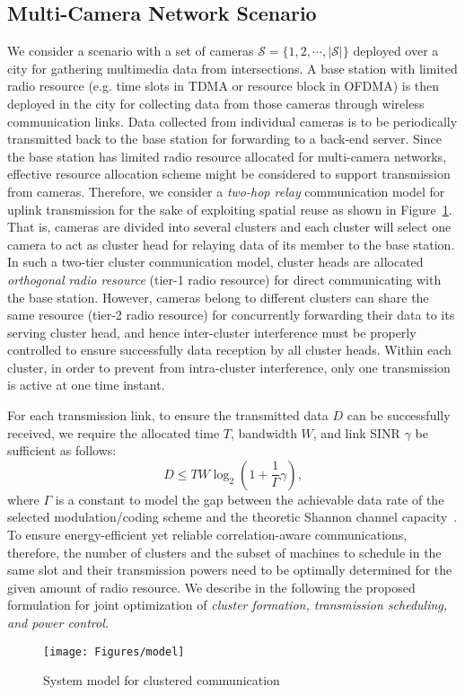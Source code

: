 \subsection{Multi-Camera Network Scenario}
\label{sec::clusterStructure}
We consider a scenario with a set of cameras ${\mathcal{S} = \{1,2,\cdots,|\mathcal{S}|\}}$
deployed over a city for gathering multimedia data from intersections.
A base station with limited radio resource (e.g. time slots in TDMA or resource
block in OFDMA) is then deployed in the city for collecting data from those cameras
through wireless communication links.
Data collected from individual cameras is to be periodically transmitted back to the
base station for forwarding to a back-end server.
Since the base station has limited radio resource allocated for multi-camera
networks, effective resource allocation scheme might be considered to support
transmission from cameras.
%
Therefore, we consider a \emph{two-hop relay} communication model for uplink
transmission for the sake of exploiting spatial reuse as shown in
Figure~\ref{fig::sysModel}.
That is, cameras are divided into several clusters and each cluster will select
one camera to act as cluster head for relaying data of its member to the base
station.
In such a two-tier cluster communication model, cluster heads are allocated
\emph{orthogonal radio resource} (tier-1 radio resource) for direct communicating
with the base station.
However, cameras belong to different clusters can share the same resource (tier-2
radio resource) for concurrently forwarding their data to its serving cluster head,
and hence inter-cluster interference must be properly controlled to ensure
successfully data reception by all cluster heads. 
Within each cluster, in order to prevent from intra-cluster interference, only one
transmission is active at one time instant.
%

For each transmission link, to ensure the transmitted data $D$ can be successfully
received, we require the allocated time $T$, bandwidth $W$, and link SINR $\gamma$
be sufficient as follows:
\begin{equation}
\label{eq::capaciy}
D \leq TW\log_2\left(1+\frac{1}{\Gamma}\gamma\right),
\end{equation}
where $\Gamma$ is a constant to model the gap between the achievable data rate
of the selected modulation/coding scheme and the theoretic Shannon channel
capacity~\cite{MQAM}.
To ensure energy-efficient yet reliable correlation-aware communications, therefore,
the number of clusters and the subset of machines to schedule in the same slot and
their transmission powers need to be optimally determined for the given amount of
radio resource.
We describe in the following the proposed formulation for joint optimization of
{\em cluster formation, transmission scheduling, and power control.}

\begin{figure}
\centering
\texttt{[image: Figures/model]}
\caption{\label{fig::sysModel}System model for clustered communication}
\end{figure}